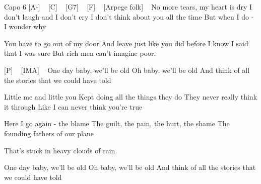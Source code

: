 

Capo 6
[A-] ~ [C] ~ [G7] ~ [F] ~
[Arpege folk] ~
No more tears, my heart is dry
I don't laugh and I don't cry
I don't think about you all the time
But when I do - I wonder why


You have to go out of my door
And leave just like you did before
I know I said that I was sure
But rich men can't imagine poor.

[P] ~ [IMA] ~
One day baby, we'll be old
Oh baby, we'll be old
And think of all the stories that we could have told

Little me and little you
Kept doing all the things they do
They never really think it through
Like I can never think you're true

Here I go again - the blame
The guilt, the pain, the hurt, the shame
The founding fathers of our plane

That's stuck in heavy clouds of rain.

One day baby, we'll be old
Oh baby, we'll be old
And think of all the stories that we could have told
